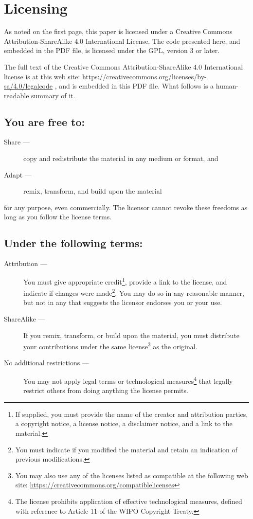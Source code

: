\documentclass[letterpaper,twoside]{article}
\begin{document}
\newpage

\section{Licensing}
\label{section:Licensing}
As noted on the first page, this paper is licensed under a Creative
Commons Attribution-ShareAlike 4.0 International License.  The code
presented here, and embedded in the PDF file, is licensed under
the GPL, version 3 or later.

The full text of the Creative Commons Attribution-ShareAlike 4.0
International license is at this web site:
\url{https://creativecommons.org/licenses/by-sa/4.0/legalcode}%
, and is embedded in this
PDF file.  What follows is a human-readable summary of it.

\subsection{You are free to:}
\begin{description}
\item[Share ---]copy and redistribute the material in any medium or format, and
\item[Adapt ---]remix, transform, and build upon the material
\end{description}
for any purpose, even commercially.  The licensor cannot revoke these
freedoms as long as you follow the license terms.
\subsection{Under the following terms:}
\begin{description}
\item[Attribution ---]You must give appropriate credit\footnote{If supplied,
  you must provide the name of the creator and attribution parties,
  a copyright notice, a license notice, a disclaimer notice, and a link
  to the material.}, provide a link to
  the license, and indicate if changes were made\footnote{You must indicate if
    you modified the material and retain an indication of previous
    modifications.}.  You may do so in any
  reasonable manner, but not in any that suggests the licensor endorses you
  or your use.
\item[ShareAlike ---]If you remix, transform, or build upon the material,
  you must distribute your contributions under the same
  license\footnote{You may also use any of the licenses listed as compatible
    at the following web site:
    \url{https://creativecommons.org/compatiblelicenses}}
  as the original.
\item[No additional restrictions ---]You may not apply legal terms or
  technological measures\footnote{The license prohibits application of
    effective technological measures, defined with reference to Article 11
    of the WIPO Copyright Treaty.}
  that legally restrict others from doing anything
  the license permits.
\end{description}
\end{document}
